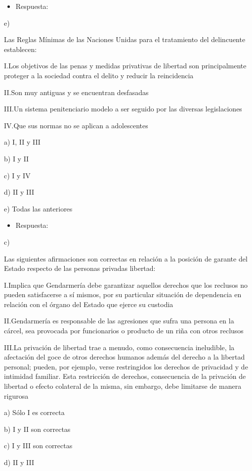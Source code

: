 \documentclass[letterpaper, 11pt]{article}
\begin{document}
\begin{itemize}
\item Respuesta:
\end{itemize}
e)


Las Reglas Mínimas de las Naciones Unidas para el tratamiento del delincuente
establecen:

I.Los objetivos de las penas y medidas privativas de libertad son principalmente
proteger a la sociedad contra el delito y reducir la reincidencia

II.Son muy antiguas y se encuentran desfasadas

III.Un sistema penitenciario modelo a ser seguido por las diversas legislaciones

IV.Que sus normas no se aplican a adolescentes

a) I, II y III

b) I y II

c) I y IV

d) II y III

e) Todas las anteriores

\begin{itemize}
\item Respuesta:
\end{itemize}
c)


Las siguientes afirmaciones son correctas en relación a la posición de garante
del Estado respecto de las personas privadas libertad:

I.Implica que Gendarmería debe garantizar aquellos derechos que los reclusos no
pueden satisfacerse a sí mismos, por su particular situación de dependencia en
relación con el órgano del Estado que ejerce su custodia

II.Gendarmería es responsable de las agresiones que sufra una persona en la cárcel,
sea provocada por funcionarios o producto de un riña con otros reclusos

III.La privación de libertad trae a menudo, como consecuencia ineludible, la
afectación del goce de otros derechos humanos además del derecho a la libertad
personal; pueden, por ejemplo, verse restringidos los derechos de privacidad y de
intimidad familiar. Esta restricción de derechos, consecuencia de la privación de
libertad o efecto colateral de la misma, sin embargo, debe limitarse de manera
rigurosa

a) Sólo I es correcta

b) I y II son correctas

c) I y III son correctas

d) II y III
\end{document}
